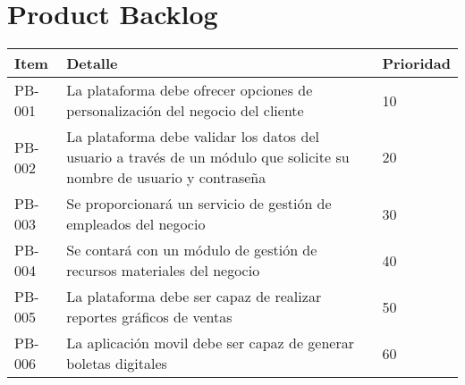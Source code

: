 \chapter{Product Backlog}

\begin{table}[htbp]
	\begin{center}
		\begin{tabular}{|p{1.5cm} | p{12cm} | p{2cm} |}
			\hline
			Item & Detalle & Prioridad \\
			\hline
			PB-001 & La plataforma debe ofrecer opciones de personalización del negocio del cliente & 10  \\
			\hline
			PB-002 & La plataforma debe validar los datos del usuario a través de un módulo que solicite su nombre de usuario y contraseña & 20 \\
			\hline
			PB-003 & Se proporcionará un servicio de gestión de empleados del negocio & 30  \\
			\hline
			PB-004 & Se contará con un módulo de gestión de recursos materiales del negocio & 40 \\
			\hline	
			PB-005 & La plataforma debe ser capaz de realizar reportes gráficos de ventas & 50 \\
			\hline
			PB-006 & La aplicación movil debe ser capaz de generar boletas digitales & 60 \\
			\hline
		\end{tabular}
	\end{center}
\end{table}
